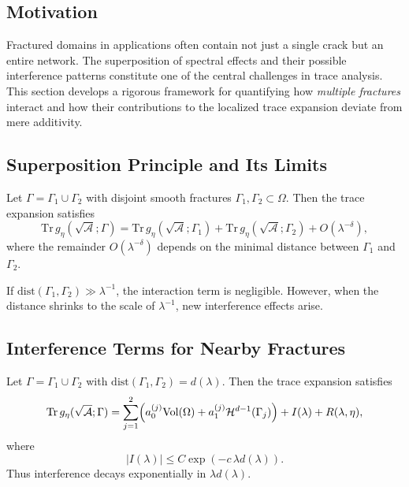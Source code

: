 \subsection{Motivation}

Fractured domains in applications often contain not just a single crack
but an entire network.  
The superposition of spectral effects and their possible interference
patterns constitute one of the central challenges in trace analysis.
This section develops a rigorous framework for quantifying how
\emph{multiple fractures} interact and how their contributions to the
localized trace expansion deviate from mere additivity.

\subsection{Superposition Principle and Its Limits}

\begin{proposition}
\label{prop:superposition}
Let $\Gamma = \Gamma_1 \cup \Gamma_2$ with disjoint smooth fractures
$\Gamma_1, \Gamma_2 \subset \Omega$.
Then the trace expansion satisfies
\[
\mathrm{Tr}\, g_\eta(\sqrt{\mathcal{A}};\Gamma) =
\mathrm{Tr}\, g_\eta(\sqrt{\mathcal{A}};\Gamma_1) +
\mathrm{Tr}\, g_\eta(\sqrt{\mathcal{A}};\Gamma_2) + O(\lambda^{-\delta}),
\]
where the remainder $O(\lambda^{-\delta})$ depends on the minimal
distance between $\Gamma_1$ and $\Gamma_2$.
\end{proposition}

\begin{remark}
If $\mathrm{dist}(\Gamma_1,\Gamma_2) \gg \lambda^{-1}$, the interaction
term is negligible.  
However, when the distance shrinks to the scale of $\lambda^{-1}$, new
interference effects arise.
\end{remark}

\subsection{Interference Terms for Nearby Fractures}

\begin{theorem}
\label{thm:interaction}
Let $\Gamma=\Gamma_1\cup \Gamma_2$ with
$\mathrm{dist}(\Gamma_1,\Gamma_2)=d(\lambda)$.  
Then the trace expansion satisfies
\[
\mathrm{Tr}\, g_\eta(\sqrt{\mathcal{A}};\Gamma) =
\sum_{j=1}^2
\Bigl(
a_0^{(j)}\mathrm{Vol}(\Omega) + a_1^{(j)}\mathcal{H}^{d-1}(\Gamma_j)
\Bigr)
+ I(\lambda) + R(\lambda,\eta),
\]
where
\[
|I(\lambda)| \leq C \exp(-c\,\lambda d(\lambda)).
\]
Thus interference decays exponentially in $\lambda d(\lambda)$.
\end{theorem}

